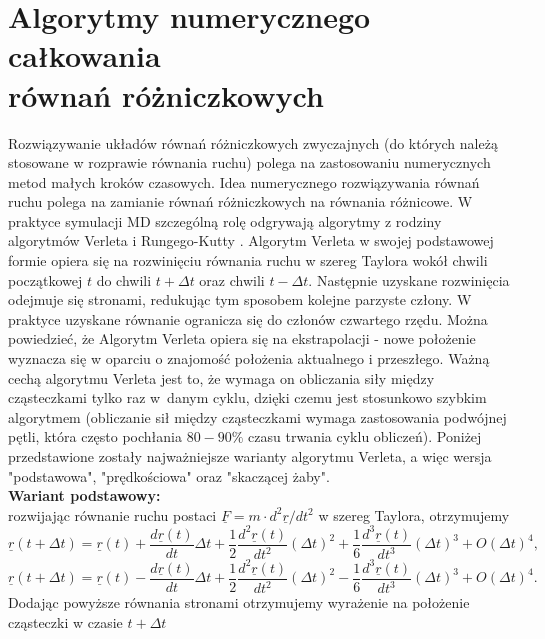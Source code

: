 \documentclass[12pt,a4paper,openright]{report} %
\begin{document}
\section{Algorytmy numerycznego całkowania \\ równań różniczkowych}
\label{algolnum}
Rozwiązywanie układów równań różniczkowych zwyczajnych (do których należą stosowane w rozprawie równania ruchu) polega na zastosowaniu numerycznych metod małych kroków czasowych. Idea numerycznego rozwiązywania równań ruchu polega na zamianie równań różniczkowych na równania różnicowe. W praktyce symulacji MD szczególną rolę odgrywają algorytmy z rodziny algorytmów Verleta \cite{Verlet1, Verlet2} i Rungego-Kutty \cite{AllenTildesley}. Algorytm Verleta w swojej podstawowej formie opiera się na rozwinięciu równania ruchu w szereg Taylora wokół chwili początkowej $t$ do chwili $t+\Delta t$ oraz chwili $t-\Delta t$. Następnie uzyskane rozwinięcia odejmuje się stronami, redukując tym sposobem kolejne parzyste człony. W praktyce uzyskane równanie ogranicza się do członów czwartego rzędu. Można powiedzieć, że Algorytm Verleta opiera się na ekstrapolacji - nowe położenie wyznacza się w oparciu o znajomość położenia aktualnego i przeszłego. Ważną cechą algorytmu Verleta jest to, że wymaga on obliczania siły między cząsteczkami tylko raz w~danym cyklu, dzięki czemu jest stosunkowo szybkim algorytmem (obliczanie sił między cząsteczkami wymaga zastosowania podwójnej pętli, która często pochłania $80-90 \%$ czasu trwania cyklu obliczeń). Poniżej przedstawione zostały najważniejsze warianty algorytmu Verleta, a więc wersja "podstawowa", "prędkościowa" oraz "skaczącej żaby".\\
\textbf{Wariant podstawowy:}\\
rozwijając równanie ruchu postaci $\underline{F}=m \cdot d^2 \underline{r} / dt^2$ w szereg Taylora, otrzymujemy
\begin{equation}
\underline{r}(t+\Delta t) = \underline{r}(t)+ \frac{d \underline{r}(t)}{dt} \Delta t + \frac{1}{2} \frac{d^2 \underline{r}(t)}{dt^2} (\Delta t)^2 + \frac{1}{6} \frac{d^3 \underline{r}(t)}{dt^3} (\Delta t)^3 + O(\Delta t)^4,
\end{equation}
\begin{equation}
\underline{r}(t+\Delta t) = \underline{r}(t) - \frac{d \underline{r}(t)}{dt} \Delta t + \frac{1}{2} \frac{d^2 \underline{r}(t)}{dt^2} (\Delta t)^2 - \frac{1}{6} \frac{d^3 \underline{r}(t)}{dt^3} (\Delta t)^3 + O(\Delta t)^4.
\end{equation}
Dodając powyższe równania stronami otrzymujemy wyrażenie na położenie cząsteczki w czasie $t+\Delta t$
\end{document}
